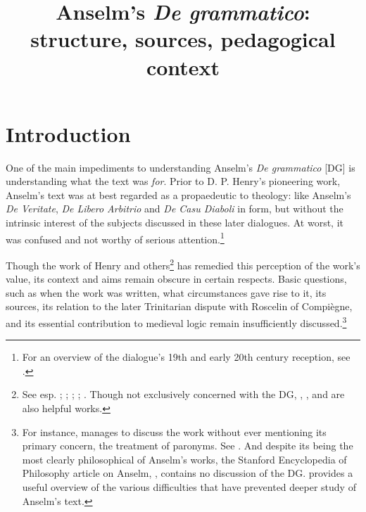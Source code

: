 \documentclass[]{article}
\title{Anselm's \textit{De grammatico}: structure, sources, pedagogical context}
\author{}
\date{}
\begin{document}
\maketitle

\section{Introduction}
One of the main impediments to understanding Anselm's \textit{De grammatico} [DG] is understanding what the text was \textit{for}. Prior to D. P. Henry's pioneering work, Anselm's text was at best regarded as a propaedeutic to theology: like Anselm's \textit{De Veritate}, \textit{De Libero Arbitrio} and \textit{De Casu Diaboli} in form, but without the intrinsic interest of the subjects discussed in these later dialogues. At worst, it was confused and not worthy of serious attention.\footnote{For an overview of the dialogue's 19th and early 20th century reception, see \cite{Steiger1969}.}


Though the work of Henry and others\footnote{See esp. \cite{Henry1960,Henry1974}; \cite{Galonnier1986a,Galonnier1987,Galonnier1996}; \cite{McCordAdams2000}; \cite{Boschung2006}; \cite{Cerezo2015}. Though not exclusively concerned with the DG, \cite{Mews1992}, \cite{Holopainen2007}, and \cite{Sharpe2009} are also helpful works.} has remedied this perception of the work's value, its context and aims remain obscure in certain respects. Basic questions, such as when the work was written, what circumstances gave rise to it, its sources, its relation to the later Trinitarian dispute with Roscelin of Compi\`{e}gne, and its essential contribution to medieval logic remain insufficiently discussed.\footnote{For instance, \cite{Sweeney2012} manages to discuss the work without ever mentioning its primary concern, the treatment of paronyms. See \cite{Holopainen2013}. And despite its being the most clearly philosophical of Anselm's works, the Stanford Encyclopedia of Philosophy article on Anselm, \cite{Williams2015}, contains no discussion of the DG. \cite{Uckelman2012} provides a useful overview of the various difficulties that have prevented deeper study of Anselm's text.}
\end{document}
